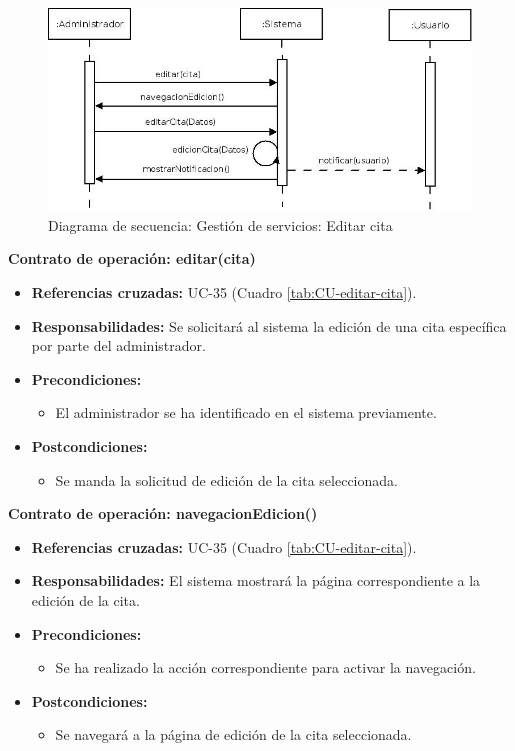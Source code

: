 \begin{figure}[H]
\centering
  \includegraphics[scale=.50]{img/secuencias/gestion-servicios-editar-cita.jpeg}
  \caption{Diagrama de secuencia: Gestión de servicios: Editar cita}
  \label{fig:secuencia-gestion-servicios-editar-cita}
\end{figure}

\textbf{Contrato de operación: editar(cita)}
\begin{itemize}
\item \textbf{Referencias cruzadas:} UC-35 (Cuadro \ref{tab:CU-editar-cita}).
\item \textbf{Responsabilidades:} Se solicitará al sistema la edición de una cita específica por parte del administrador.
\item \textbf{Precondiciones:} 
 \begin{itemize}
\item El administrador se ha identificado en el sistema previamente.
\end {itemize}
\item \textbf{Postcondiciones:} 
 \begin{itemize}
\item Se manda la solicitud de edición de la cita seleccionada.
\end {itemize}
\end {itemize}

\textbf{Contrato de operación: navegacionEdicion()}
\begin{itemize}
\item \textbf{Referencias cruzadas:} UC-35 (Cuadro \ref{tab:CU-editar-cita}).
\item \textbf{Responsabilidades:} El sistema mostrará la página correspondiente a la edición de la cita.
\item \textbf{Precondiciones:} 
 \begin{itemize}
\item Se ha realizado la acción correspondiente para activar la navegación.
\end {itemize}
\item \textbf{Postcondiciones:} 
 \begin{itemize}
\item Se navegará a la página de edición de la cita seleccionada.
\end {itemize}
\end {itemize}

